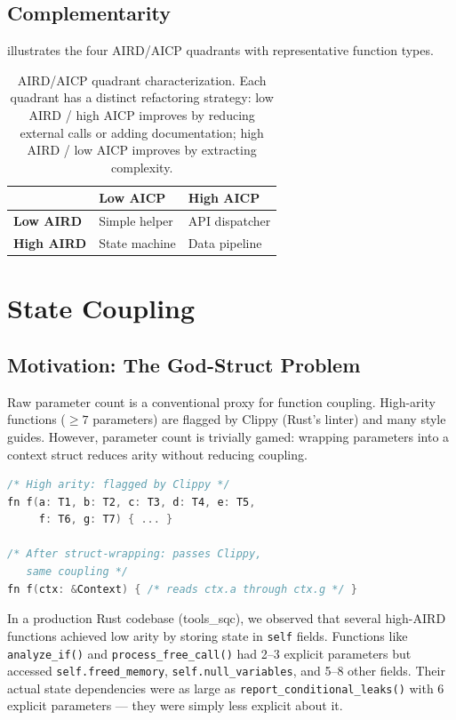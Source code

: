 \documentclass[10pt,twocolumn,letterpaper]{article}
\begin{document}
\subsection{Complementarity}

 illustrates the four AIRD/AICP quadrants with
representative function types.

\begin{table}[t]
\centering
\footnotesize
\begin{tabular}{@{}lll@{}}
\toprule
                  & \textbf{Low AICP} & \textbf{High AICP} \\
\midrule
\textbf{Low AIRD}  & Simple helper    & API dispatcher \\
\textbf{High AIRD} & State machine    & Data pipeline \\
\bottomrule
\end{tabular}
\caption{AIRD/AICP quadrant characterization.  Each quadrant has a
distinct refactoring strategy: low AIRD / high AICP improves by reducing
external calls or adding documentation; high AIRD / low AICP improves
by extracting complexity.}
\label{tab:quadrants}
\end{table}

\section{State Coupling}
\label{sec:state-coupling}

\subsection{Motivation: The God-Struct Problem}

Raw parameter count is a conventional proxy for function coupling.
High-arity functions ($\geq 7$ parameters) are flagged by Clippy (Rust's
linter) and many style guides.  However, parameter count is trivially
gamed: wrapping parameters into a context struct reduces arity without
reducing coupling.

\begin{lstlisting}[language=C]
/* High arity: flagged by Clippy */
fn f(a: T1, b: T2, c: T3, d: T4, e: T5,
     f: T6, g: T7) { ... }

/* After struct-wrapping: passes Clippy,
   same coupling */
fn f(ctx: &Context) { /* reads ctx.a through ctx.g */ }
\end{lstlisting}

In a production Rust codebase (tools\_sqc), we observed that several
high-AIRD functions achieved low arity by storing state in \texttt{self}
fields.  Functions like \texttt{analyze\_if()} and
\texttt{process\_free\_call()} had 2--3 explicit parameters but accessed
\texttt{self.freed\_memory}, \texttt{self.null\_variables}, and 5--8 other
fields.  Their actual state dependencies were as large as
\texttt{report\_conditional\_leaks()} with 6 explicit parameters ---
they were simply less explicit about it.
\end{document}
